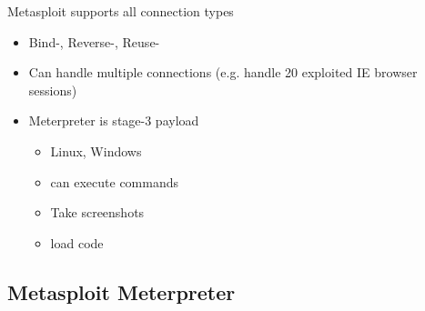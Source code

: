 Metasploit supports all connection types
\begin{itemize}
  \item Bind-, Reverse-, Reuse-
  \item Can handle multiple connections (e.g. handle 20 exploited IE browser sessions)
  \item Meterpreter is stage-3 payload
  \begin{itemize}
    \tightlist
    \item Linux, Windows
    \item can execute commands
    \item Take screenshots
    \item load code
  \end{itemize}
\end{itemize}

\subsection{Metasploit Meterpreter}
